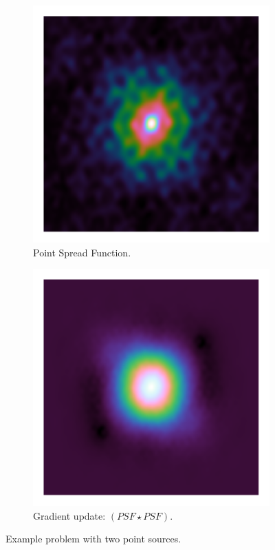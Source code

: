 \begin{figure}[!h]
	\centering
	\begin{subfigure}[b]{0.3\linewidth}
		\includegraphics[width=\linewidth, clip, trim= 0.25in 0.25in 0.25in 0.25in]{./chapters/03.cd/simulated/psf.png}
		\caption{Point Spread Function.}
		\label{cd:efficient:update:dirty}
	\end{subfigure}
	\begin{subfigure}[b]{0.3\linewidth}
		\includegraphics[width=\linewidth, clip, trim= 0.25in 0.25in 0.25in 0.25in]{./chapters/03.cd/simulated/psfSquared.png}
		\caption{Gradient update: $(PSF \star PSF)$.}
		\label{cd:efficient:update:psf}
	\end{subfigure}
	\caption{Example problem with two point sources.}
	\label{cd:efficient:update:figure}
\end{figure}

